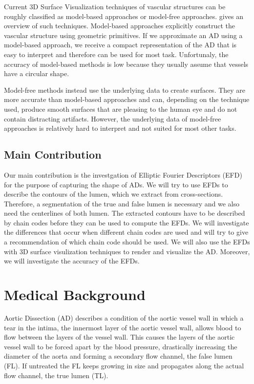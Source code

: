 \documentclass[thesis.tex]{subfiles}
\begin{document}
Current 3D Surface Visualization techniques of vascular structures can be roughly classified as model-based approaches or model-free approaches. \cite{preim20083d} gives an overview of such techniques. Model-based approaches explicitly construct the vascular structure using geometric primitives. If we approximate an AD using a model-based approach, we receive a compact representation of the AD that is easy to interpret and therefore can be used for most task. Unfortunaly, the accuracy of model-based methods is low because they usually assume that vessels have a circular shape.  

Model-free methods instead use the underlying data to create surfaces. They are more accurate than model-based approaches and can, depending on the technique used, produce smooth surfaces that are pleasing to the human eye and do not contain distracting artifacts. However, the underlying data of model-free approaches is relatively hard to interpret and not suited for most other tasks. 

\section{Main Contribution}

Our main contribution is the investgation of Elliptic Fourier Descriptors (EFD) for the purpose of capturing the shape of ADs. We will try to use EFDs to describe the contours of the lumen, which we extract from cross-sections. Therefore, a segmentation of the true and false lumen is necessary and we also need the centerlines of both lumen. The extracted contours have to be described by chain codes before they can be used to compute the EFDs. We will investigate the differences that occur when different chain codes are used and will try to give a recommendation of which chain code should be used. We will also use the EFDs with 3D surface visulization techniques to render and visualize the AD. Moreover, we will investigate the accuracy of the EFDs.

\chapter{Medical Background}

Aortic Dissection (AD) describes a condition of the aortic vessel wall in which a tear in the intima, the innermost layer of the aortic vessel wall, allows blood to flow between the layers of the vessel wall. This causes the layers of the aortic vessel wall to be forced apart by the blood pressure, drastically increasing the diameter of the aorta and forming a secondary flow channel, the false lumen (FL). If untreated the FL keeps growing in size and propagates along the actual flow channel, the true lumen (TL).
\end{document}
